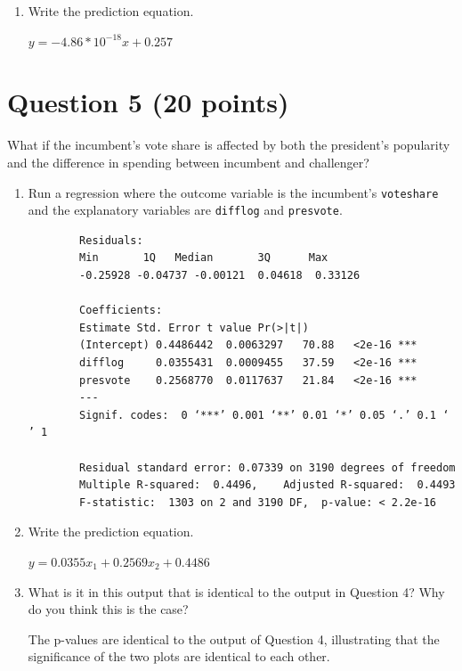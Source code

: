 \documentclass[12pt,letterpaper]{article}
\begin{document}
\begin{enumerate}
		\item Write the prediction equation.
		
		$y=-4.86*10^{-18}x+0.257$
	\end{enumerate}
	
	\newpage	

\section*{Question 5 (20 points)}
\noindent What if the incumbent's vote share is affected by both the president's popularity and the difference in spending between incumbent and challenger? 
	\begin{enumerate}
		\item Run a regression where the outcome variable is the incumbent's \texttt{voteshare} and the explanatory variables are \texttt{difflog} and \texttt{presvote}.
		
			\begin{verbatim}
		Residuals:
		Min       1Q   Median       3Q      Max 
		-0.25928 -0.04737 -0.00121  0.04618  0.33126 
		
		Coefficients:
		Estimate Std. Error t value Pr(>|t|)    
		(Intercept) 0.4486442  0.0063297   70.88   <2e-16 ***
		difflog     0.0355431  0.0009455   37.59   <2e-16 ***
		presvote    0.2568770  0.0117637   21.84   <2e-16 ***
		---
		Signif. codes:  0 ‘***’ 0.001 ‘**’ 0.01 ‘*’ 0.05 ‘.’ 0.1 ‘ ’ 1
		
		Residual standard error: 0.07339 on 3190 degrees of freedom
		Multiple R-squared:  0.4496,	Adjusted R-squared:  0.4493 
		F-statistic:  1303 on 2 and 3190 DF,  p-value: < 2.2e-16
		\end{verbatim}
			\vspace{2cm}
		\item Write the prediction equation.
		
		$y=0.0355x_{1}+0.2569x_{2}+0.4486$
		
			\vspace{5cm}
		\item What is it in this output that is identical to the output in Question 4? Why do you think this is the case?	
		
		The p-values are identical to the output of Question 4, illustrating that the significance of the two plots are identical to each other.
		\vspace{5cm}
	\end{enumerate}
\end{document}
